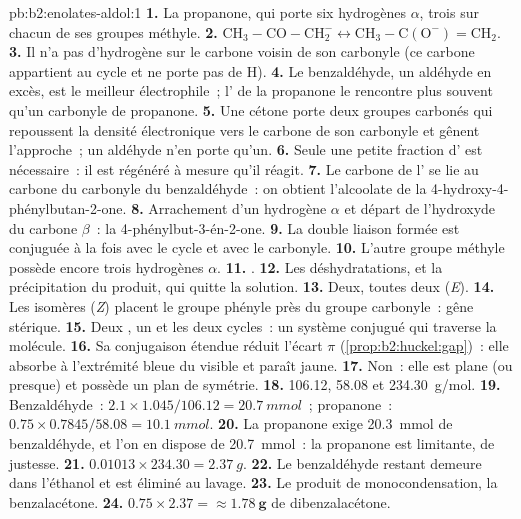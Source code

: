 \begin{solution}{pb:b2:enolates-aldol:1}
\textbf{1.} La propanone, qui porte six hydrogènes $\alpha$, trois sur chacun de ses groupes méthyle.
\textbf{2.} $\mathrm{CH_3{-}CO{-}CH_2^-} \leftrightarrow \mathrm{CH_3{-}C(O^-){=}CH_2}$.
\textbf{3.} Il n'a pas d'hydrogène sur le carbone voisin de son carbonyle (ce carbone appartient au cycle
et ne porte pas de H).
\textbf{4.} Le benzaldéhyde, un aldéhyde en excès, est le meilleur électrophile~; l' de la propanone
le rencontre plus souvent qu'un carbonyle de propanone.
\textbf{5.} Une cétone porte deux groupes carbonés qui repoussent la densité électronique vers le carbone
de son carbonyle et gênent l'approche~; un aldéhyde n'en porte qu'un.
\textbf{6.} Seule une petite fraction d' est nécessaire~: il est régénéré à mesure qu'il réagit.
\textbf{7.} Le carbone de l' se lie au carbone du carbonyle du benzaldéhyde~: on obtient l'alcoolate de
la 4-hydroxy-4-phénylbutan-2-one.
\textbf{8.} Arrachement d'un hydrogène $\alpha$ et départ de l'hydroxyde du carbone $\beta$~: la 4-phénylbut-3-én-2-one.
\textbf{9.} La double liaison formée est conjuguée à la fois avec le cycle et avec le carbonyle.
\textbf{10.} L'autre groupe méthyle possède encore trois hydrogènes $\alpha$.
\textbf{11.} .
\textbf{12.} Les déshydratations, et la précipitation du produit, qui quitte la solution.
\textbf{13.} Deux, toutes deux (\textit{E}).
\textbf{14.} Les isomères (\textit{Z}) placent le groupe phényle près du groupe carbonyle~: gêne stérique.
\textbf{15.} Deux , un  et les deux cycles~: un système conjugué qui traverse la molécule.
\textbf{16.} Sa conjugaison étendue réduit l'écart $\pi$ (\cref{prop:b2:huckel:gap})~: elle absorbe à
l'extrémité bleue du visible et paraît jaune.
\textbf{17.} Non~: elle est plane (ou presque) et possède un plan de symétrie.
\textbf{18.} 106.12, 58.08 et \qty{234.30}{g/mol}.
\textbf{19.} Benzaldéhyde~: $2.1 \times 1.045/106.12 = \qty{20.7}{mmol}$~; propanone~: $0.75 \times
0.7845/58.08 = \qty{10.1}{mmol}$.
\textbf{20.} La propanone exige \qty{20.3}{mmol} de benzaldéhyde, et l'on en dispose de \qty{20.7}{mmol}~:
la propanone est limitante, de justesse.
\textbf{21.} $0.01013 \times 234.30 = \qty{2.37}{g}$.
\textbf{22.} Le benzaldéhyde restant demeure dans l'éthanol et est éliminé au lavage.
\textbf{23.} Le produit de monocondensation, la benzalacétone.
\textbf{24.} $0.75 \times 2.37 = \boldsymbol{\approx \qty{1.78}{g}}$ de dibenzalacétone.
\end{solution}
